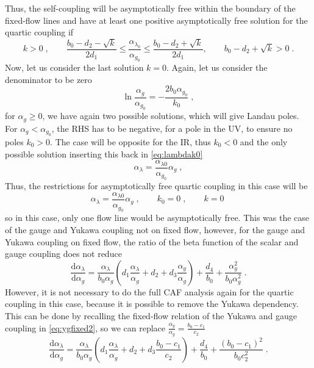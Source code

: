 Thus, the self-coupling will be asymptotically free within the boundary of the fixed-flow lines and have at least one positive asymptotically free solution for the quartic coupling if
\begin{equation}
    k>0\;,\quad\quad  \frac{b_0-d_2-\sqrt{k}}{2d_1}\le \frac{\alpha_{\lambda_0}}{\alpha_{g_0}}\le \frac{b_0-d_2+\sqrt{k}}{2d_1}, \quad\quad {b_0-d_2+\sqrt{k}}>0\;.
\end{equation}
Now, let us consider the last solution $k=0$. Again, let us consider the denominator to be zero
\begin{equation}
    \ln\frac{\alpha_g}{\alpha_{g_0}}=-\frac{2b_0\alpha_{g_0}}{k_0}\;,
\end{equation}
for $\alpha_g\ge0$, we have again two possible solutions, which will give Landau poles. For $\alpha_g<\alpha_{g_0}$, the RHS has to be negative, for a pole in the UV, to ensure no poles $k_0>0$. The case will be opposite for the IR, thus $k_0<0$ and the only possible solution inserting this back in \eqref{eq:lambdak0}
\begin{equation}
    \alpha_{\lambda} = \frac{ \alpha_{\lambda0}  }{ \alpha_{g_0}  } \alpha_g\;,
\end{equation}
Thus, the restrictions for asymptotically free quartic coupling in this case will be
\begin{equation}
    \alpha_{\lambda} = \frac{ \alpha_{\lambda0}  }{ \alpha_{g_0}  } \alpha_g\;,\quad\quad k_0=0\;, \quad\quad k=0\;
\end{equation}
so in this case, only one flow line would be asymptotically free. 
This was the case of the gauge and Yukawa coupling not on fixed flow, however, for the gauge and Yukawa coupling on fixed flow, the ratio of the beta function of the scalar and gauge coupling does not reduce
\begin{equation}
    \frac{\text{d} \alpha_\lambda}{\text{d}\alpha_g}=\frac{\alpha_\lambda}{b_0\alpha_g}\left(d_1\frac{\alpha_\lambda}{\alpha_g} + d_2+d_3\frac{\alpha_y}{\alpha_g}\right)+\frac{d_4}{b_0}+\frac{\alpha_y^2}{b_0\alpha_g^2}\;.
\end{equation}
However, it is not necessary to do the full CAF analysis again for the quartic coupling in this case, because it is possible to remove the Yukawa dependency. This can be done by recalling the fixed-flow relation of the Yukawa and gauge coupling in \eqref{eq:ygfixed2}, so we can replace $\frac{\alpha_y}{\alpha_g}=\frac{b_0-c_1}{c_2}$ 
\begin{equation}
    \frac{\text{d} \alpha_\lambda}{\text{d}\alpha_g}=\frac{\alpha_\lambda}{b_0\alpha_g}\left(d_1\frac{\alpha_\lambda}{\alpha_g} + d_2+d_3\frac{b_0-c_1}{c_2}\right)+\frac{d_4}{b_0}+\frac{(b_0-c_1)^2}{b_0c_2^2}\;.
\end{equation}

